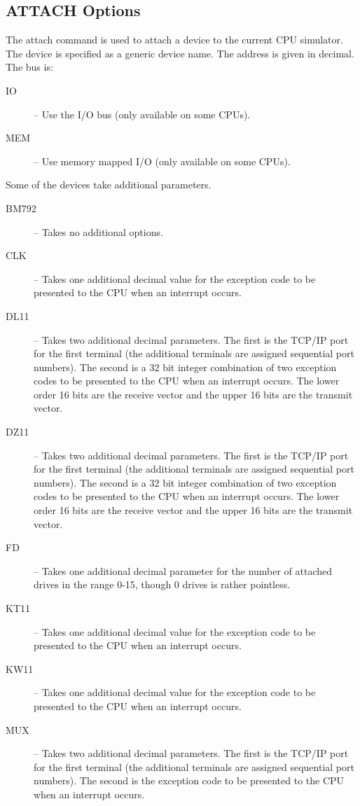 \documentclass[10pt, openany]{book}
\begin{document}
\subsection{ATTACH Options}
\label{cli:Attach}
The attach command is used to attach a device to the current CPU simulator.
The device is specified as a generic device name.
The address is given in decimal.
The bus is:
\begin{description}
  \item[IO] -- Use the I/O bus (only available on some CPUs).
  \item[MEM] -- Use memory mapped I/O (only available on some CPUs).
\end{description}
Some of the devices take additional parameters.
\begin{description}
  \item[BM792] --  Takes no additional options.
  \item[CLK] -- Takes one additional decimal value for the exception code to be presented to the CPU when an interrupt occurs.
  \item[DL11] -- Takes two additional decimal parameters.  The first is the TCP/IP port for the first terminal (the additional terminals are assigned sequential port numbers).  The second is a 32 bit integer combination of two exception codes to be presented to the CPU when an interrupt occurs.  The lower order 16 bits are the receive vector and the upper 16 bits are the transmit vector.
  \item[DZ11] -- Takes two additional decimal parameters.  The first is the TCP/IP port for the first terminal (the additional terminals are assigned sequential port numbers).  The second is a 32 bit integer combination of two exception codes to be presented to the CPU when an interrupt occurs.  The lower order 16 bits are the receive vector and the upper 16 bits are the transmit vector.
  \item[FD] -- Takes one additional decimal parameter for the number of attached drives in the range 0-15, though 0 drives is rather pointless.
  \item[KT11] -- Takes one additional decimal value for the exception code to be presented to the CPU when an interrupt occurs.
  \item[KW11] -- Takes one additional decimal value for the exception code to be presented to the CPU when an interrupt occurs.
  \item[MUX] -- Takes two additional decimal parameters.  The first is the TCP/IP port for the first terminal (the additional terminals are assigned sequential port numbers).  The second is the exception code to be presented to the CPU when an interrupt occurs.

\end{description}
\end{document}
